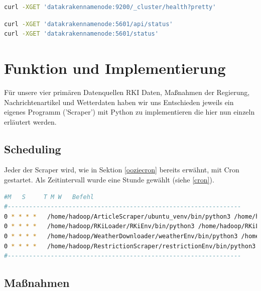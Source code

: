 \documentclass[12pt,oneside,a4paper,parskip]{scrbook}
\begin{document}
\begin{lstlisting}[caption=Statusabfrage Elasticsearch,label=statuselastic,language=bash]
curl -XGET 'datakrakennamenode:9200/_cluster/health?pretty'
\end{lstlisting}

\begin{lstlisting}[caption=Statusabfrage Kibana,label=statuskibana,language=bash]
curl -XGET 'datakrakennamenode:5601/api/status'
curl -XGET 'datakrakennamenode:5601/status'
\end{lstlisting}





\chapter{Funktion und Implementierung}

Für unsere vier primären Datenquellen RKI Daten, Maßnahmen der Regierung, Nachrichtenartikel und Wetterdaten haben wir uns Entschieden jeweils ein eigenes Programm ('Scraper') mit Python zu implementieren die hier nun einzeln erläutert werden. \newline

\section{Scheduling}
Jeder der Scraper wird, wie in Sektion \ref{ooziecron} bereits erwähnt, mit Cron gestartet. Als Zeitintervall wurde eine Stunde gewählt (siehe \ref{cron}). \newline

\begin{lstlisting}[caption=Cron-einstellungen,label=cron,language=bash]
#M   S     T M W   Befehl
#-----------------------------------------------------------------
0 * * * *   /home/hadoop/ArticleScraper/ubuntu_venv/bin/python3 /home/hadoop/ArticleScraper/main.py
0 * * * *   /home/hadoop/RKiLoader/RKiEnv/bin/python3 /home/hadoop/RKiLoader/main.py
0 * * * *   /home/hadoop/WeatherDownloader/weatherEnv/bin/python3 /home/hadoop/WeatherDownloader/__main__.py
0 * * * *   /home/hadoop/RestrictionScraper/restrictionEnv/bin/python3 /home/hadoop/RestrictionScraper/main.py
#-----------------------------------------------------------------
\end{lstlisting}

\pagebreak

\section{Maßnahmen}
\end{document}
